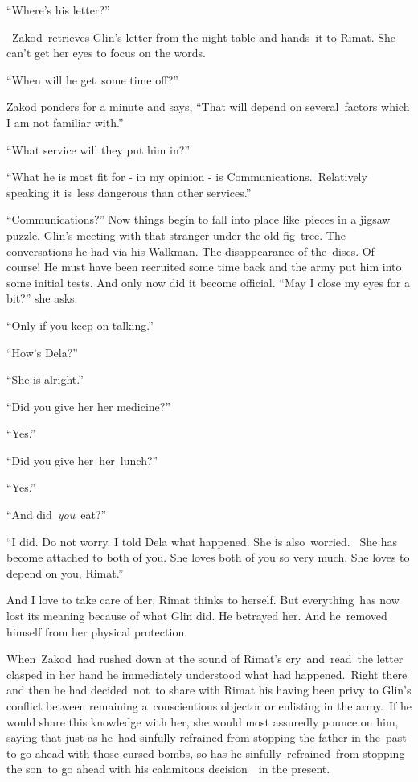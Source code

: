 \documentclass[twoside,11pt]{book}
\begin{document}
``Where{}'s his letter?'' 

~Zakod~retrieves Glin{}'s letter from the night table and hands\ it to Rimat. She can{}'t get her eyes to focus on the
words. 

 ``When will he get~some time off?''

Zakod ponders for a minute and says, ``That will depend on several\ factors which I am not familiar with.'' 

{}``What service will they put him in?{}''

{}``What he is most fit for - in my opinion - is Communications.\ Relatively speaking it is~less dangerous than other
services.''\ 

{}``Communications?'' Now things begin to fall into place like\ pieces in a jigsaw puzzle. Glin's meeting with that
stranger under the old fig\ tree. The conversations he had via his Walkman. The disappearance of the\ discs. Of course!
He must have been recruited some time back and the army put him into some initial tests. And only now did it become
official. ``May I close my eyes for a bit?'' she asks.\ 

{}``Only if you keep on talking.''\ 

{}``How{}'s Dela?''\ 

{}``She is alright.''\ 

{}``Did you give her her medicine?''\ 

{}``Yes.''\ 

{}``Did you give her{\ }her\ lunch?''\ 

{}``Yes.''\ 

{}``And did\ \textit{you}\ eat?''\ 

{}``I did. Do not worry. I told Dela what happened. She is also\ worried.~ She has become attached to both of you. She
loves both of you so very much. She loves to depend on you, Rimat.{}''

And I love to take care of her, Rimat thinks to herself. But everything\ has now lost its meaning because of what Glin
did. He betrayed her. And he\ removed himself from her physical protection.

When{\ }Zakod\ had rushed down at the sound of Rimat{}'s cry\ and\ read\ the letter clasped in her hand
he immediately understood what had happened.\ Right there and then he had decided{\ }not\ to share with
Rimat his having been privy to Glin{}'s conflict between remaining a~conscientious objector or enlisting in the
army.\ If he would share this knowledge with her, she would most assuredly pounce on him, saying that just as he\ had
sinfully refrained from stopping the father in the\ past to go ahead with those cursed bombs, so has he
sinfully\ refrained\ from stopping the son\ to go ahead with his calamitous decision\ \ in the present. 
\end{document}
